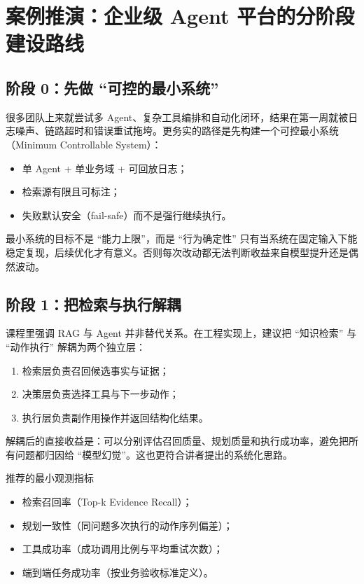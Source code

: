 \section{案例推演：企业级 Agent 平台的分阶段建设路线}

\subsection{阶段 0：先做 ``可控的最小系统''}
很多团队上来就尝试多 Agent、复杂工具编排和自动化闭环，结果在第一周就被日志噪声、链路超时和错误重试拖垮。更务实的路径是先构建一个可控最小系统（Minimum Controllable System）：
\begin{itemize}
    \item 单 Agent + 单业务域 + 可回放日志；
    \item 检索源有限且可标注；
    \item 失败默认安全（fail-safe）而不是强行继续执行。
\end{itemize}

\begin{importantbox}{最小系统的目标不是 ``能力上限''，而是 ``行为确定性''}
只有当系统在固定输入下能稳定复现，后续优化才有意义。否则每次改动都无法判断收益来自模型提升还是偶然波动。
\end{importantbox}

\subsection{阶段 1：把检索与执行解耦}
课程里强调 RAG 与 Agent 并非替代关系。在工程实现上，建议把 ``知识检索'' 与 ``动作执行'' 解耦为两个独立层：
\begin{enumerate}
    \item 检索层负责召回候选事实与证据；
    \item 决策层负责选择工具与下一步动作；
    \item 执行层负责副作用操作并返回结构化结果。
\end{enumerate}

解耦后的直接收益是：可以分别评估召回质量、规划质量和执行成功率，避免把所有问题都归因给 ``模型幻觉''。这也更符合讲者提出的系统化思路。

\begin{knowledgebox}{推荐的最小观测指标}
\begin{itemize}
    \item 检索召回率（Top-k Evidence Recall）；
    \item 规划一致性（同问题多次执行的动作序列偏差）；
    \item 工具成功率（成功调用比例与平均重试次数）；
    \item 端到端任务成功率（按业务验收标准定义）。
\end{itemize}
\end{knowledgebox}

